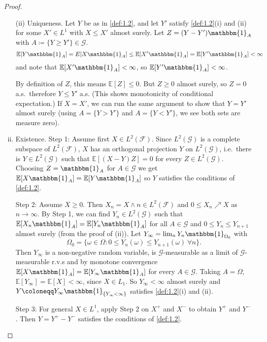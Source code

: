 \documentclass{article}
\newcommand{\F}{\mathcal{F}}
\newcommand{\G}{\mathcal{G}}
\newcommand{\1}[1]{\mathbbm{1}_{#1}}
\newcommand{\E}{\mathbb{E}}
\begin{document}
\begin{proof}\leavevmode
  \begin{enumerate}[(i)]
    \item[(ii)] Uniqueness. Let $Y$ be as in \cref{def:1.2}, and let $Y'$ satisfy \cref*{def:1.2}(i) and (ii) for some $X' \in L^1$ with $X \leq X'$ almost surely.
      Let $Z = (Y-Y') \1A$ with $A \coloneqq \{Y \geq Y'\} \in \G$.
      \begin{equation*}
        \E[Y \1A] = %
        E[X \1A] \leq %
        \E[X' \1A] =
        \E[Y' \1A] < \infty
      \end{equation*}
      and note that $\E[X' \1A] < \infty$, so $\E[Y' \1A] < \infty$.

      By definition of $Z$, this means $\E[Z] \leq 0$. But $Z \geq 0$ almost surely, so $Z=0$ a.s.\ therefore $Y \leq Y'$ a.s.
      (This shows monotonicity of conditional expectation.)
      If $X = X'$, we can run the same argument to show that $Y = Y'$ almost surely (using $A = \{Y > Y'\}$ and $A = \{Y < Y'\}$, we see both sets are measure zero).
    \item Existence. Step 1: Assume first $X \in L^2(\F)$. Since $L^2(\G)$ is a complete subspace of $L^2(\F)$, $X$ has an orthogonal projection $Y$ on $L^2(\G)$, i.e.\ there is $Y \in L^2(\G)$ such that $\E[(X-Y)Z] = 0$ for every $Z \in L^2(\G)$.
      Choosing $Z = \1A$ for $A \in \G$ we get $\E[X \1A] = \E[Y \1A]$ so $Y$ satisfies the conditions of \cref{def:1.2}.

      Step 2: Assume $X \geq 0$. Then $X_n = X \wedge n \in L^2(\F)$ and $0 \leq X_n \nearrow X$ as $n \to \infty$.
      By Step 1, we can find $Y_n \in L^2(\G)$ such that $\E[X_n \1A] = \E[Y_n \1A]$ for all $A \in \G$ and $0 \leq Y_n \leq Y_{n+1}$ almost surely (from the proof of (ii)).
      Let $Y_\infty = \lim_n Y_n \1{\Omega_0}$ with
      \begin{equation*}
        \Omega_0 = \{\omega \in \Omega : 0 \leq Y_n(\omega) \leq Y_{n+1}(\omega) \ \forall n\}.
      \end{equation*}
      Then $Y_\infty$ is a non-negative random variable, is $\G$-measurable as a limit of $\G$-measurable r.v.s and by monotone convergence $\E[X \1A] = \E[Y_\infty \1A]$ for every $A \in \G$.
      Taking $A = \Omega$, $\E[Y_\infty] = \E[X] < \infty$, since $X \in L_1$.
      So $Y_\infty < \infty$ almost surely and $Y \coloneqq Y_\infty \1{\{Y_\infty < \infty\}}$ satisfies \cref{def:1.2}(i) and (ii).

      Step 3: For general $X \in L^1$, apply Step 2 on $X^+$ and $X^-$ to obtain $Y^+$ and $Y^-$. Then $Y = Y^+ - Y^-$ satisfies the conditions of \cref{def:1.2}. \qedhere
  \end{enumerate}
\end{proof}
\printindex
\end{document}
